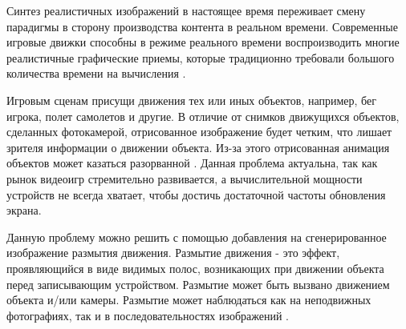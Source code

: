 \Introduction
Синтез реалистичных изображений в настоящее время переживает смену парадигмы в сторону производства контента в реальном времени. Современные игровые движки способны в режиме реального времени воспроизводить многие реалистичные графические приемы, которые традиционно требовали большого количества времени на вычисления \cite{RONNOW202136}.  
\par
Игровым сценам присущи движения тех или иных объектов, например, бег игрока, полет самолетов и другие. В отличие от снимков движущихся объектов, сделанных фотокамерой, отрисованное изображение будет четким, что лишает зрителя информации о движении объекта. Из-за этого отрисованная анимация объектов может казаться разорванной \cite{Navarro11}.   Данная проблема актуальна, так как рынок видеоигр стремительно развивается, а вычислительной мощности устройств не всегда хватает, чтобы достичь достаточной частоты обновления экрана.
\par
Данную проблему можно решить с помощью добавления на сгенерированное изображение размытия движения. Размытие движения - это эффект, проявляющийся в виде видимых полос, возникающих при движении объекта перед записывающим устройством. Размытие может быть вызвано движением объекта и/или камеры.  Размытие может наблюдаться как на неподвижных фотографиях, так и в последовательностях изображений \cite{Navarro11}.  

